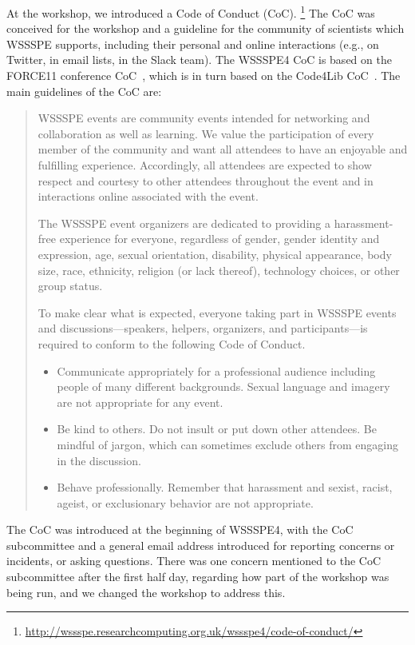 \documentclass[11pt, oneside]{amsart}
\begin{document}
At the workshop, we introduced a Code of Conduct (CoC).%
\footnote{\url{http://wssspe.researchcomputing.org.uk/wssspe4/code-of-conduct/}}
The CoC was conceived for the workshop and a guideline for the community of scientists which WSSSPE
supports, including their personal and online interactions (e.g., on
Twitter, in email lists, in the Slack team). The WSSSPE4 CoC is based on the
FORCE11 conference CoC~\cite{FORCE11:CoC}, which is in turn based on the Code4Lib
CoC~\cite{Code4Lib:CoC}.
The main guidelines of the CoC are:
\begin{quote}
    WSSSPE events are community events intended for networking and collaboration
    as well as learning. We value the participation of every member of the
    community and want all attendees to have an enjoyable and fulfilling
    experience. Accordingly, all attendees are expected to show respect and
    courtesy to other attendees throughout the event and in interactions online
    associated with the event.

    The WSSSPE event organizers are dedicated to providing a harassment-free
    experience for everyone, regardless of gender, gender identity and
    expression, age, sexual orientation, disability, physical appearance,
    body size, race, ethnicity, religion (or lack thereof), technology choices,
    or other group status.

    To make clear what is expected, everyone taking part in WSSSPE events and
    discussions---speakers, helpers, organizers, and participants---is required
    to conform to the following Code of Conduct.

    \begin{itemize}
    \item Communicate appropriately for a professional audience including
    people of many different backgrounds. Sexual language and imagery are not
    appropriate for any event.

    \item Be kind to others. Do not insult or put down other attendees. Be
    mindful of jargon, which can sometimes exclude others from engaging in the
    discussion.

    \item Behave professionally. Remember that harassment and sexist, racist,
    ageist, or exclusionary behavior are not appropriate.
    \end{itemize}
\end{quote}

The CoC was introduced at the beginning of WSSSPE4, with the CoC subcommittee
and a general email address introduced for reporting concerns or incidents, or
asking questions.  There was one concern mentioned to the CoC subcommittee
after the first half day,
regarding how part of the workshop was being run, and we changed the workshop
to address this.
\end{document}
